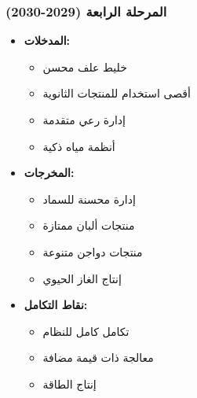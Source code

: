 \subsubsection{المرحلة الرابعة (2029-2030)}
\begin{itemize}
    \item \textbf{المدخلات:}
    \begin{itemize}
        \item خليط علف محسن
        \item أقصى استخدام للمنتجات الثانوية
        \item إدارة رعي متقدمة
        \item أنظمة مياه ذكية
    \end{itemize}
    \item \textbf{المخرجات:}
    \begin{itemize}
        \item إدارة محسنة للسماد
        \item منتجات ألبان ممتازة
        \item منتجات دواجن متنوعة
        \item إنتاج الغاز الحيوي
    \end{itemize}
    \item \textbf{نقاط التكامل:}
    \begin{itemize}
        \item تكامل كامل للنظام
        \item معالجة ذات قيمة مضافة
        \item إنتاج الطاقة
    \end{itemize}
\end{itemize}

